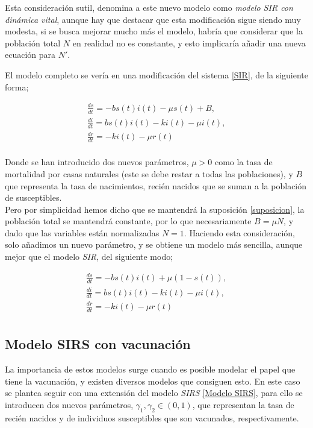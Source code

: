 \documentclass[journal]{IEEEtran}
\begin{document}
Esta consideración sutil, denomina a este nuevo modelo como \textit{modelo SIR con dinámica vital}\cite{SIRS-VAC}, aunque 
hay que destacar que esta modificación sigue siendo muy modesta, si se busca mejorar mucho más el modelo, 
habría que considerar que la población total $N$ en realidad no es constante, y esto implicaría añadir una nueva
ecuación para $N'$.

El modelo completo se vería en una modificación del sistema \ref{SIR}, de la siguiente forma;

\begin{equation*}
    \begin{split}
      \frac{ds}{dt} = -bs(t)i(t) - \mu s(t) + B,\\
      \frac{di}{dt} = bs(t)i(t)-ki(t)-\mu i(t),\\
      \frac{dr}{dt} = -ki(t) - \mu r(t)\\
    \end{split}
\end{equation*}

Donde se han introducido dos nuevos parámetros, $\mu > 0$ como la tasa de mortalidad por casas naturales 
(este se debe restar a todas las poblaciones), y $B$ que representa la tasa de nacimientos, recién nacidos que se suman
a la población de susceptibles.\\ 

Pero por simplicidad hemos dicho que se mantendrá la suposición \ref{suposicion}, la población
total se mantendrá constante, por lo que necesariamente $B = \mu N$, y dado que las variables están normalizadas
$N=1$. Haciendo esta consideración, solo añadimos un nuevo parámetro, 
y se obtiene un modelo más sencilla, aunque mejor que el modelo \textit{SIR}, del siguiente modo;

\begin{equation}\label{SIRS}
  \begin{split}
    \frac{ds}{dt} = -bs(t)i(t) + \mu (1 - s(t)) ,\\
    \frac{di}{dt} = bs(t)i(t)-ki(t)-\mu i(t),\\
    \frac{dr}{dt} = -ki(t) - \mu r(t)\\
  \end{split}
\end{equation}

\subsection{Modelo SIRS con vacunación}
La importancia de estos modelos surge cuando es posible modelar el papel que tiene la vacunación, y existen diversos modelos
que consiguen esto. En este caso se plantea seguir con una extensión del modelo \textit{SIRS} \ref{Modelo SIRS},
para ello se introducen dos nuevos parámetros, $\gamma_1, \gamma_2 \in (0,1)$, que representan la tasa de recién nacidos
y de individuos susceptibles que son vacunados, respectivamente.\\ 
\end{document}
